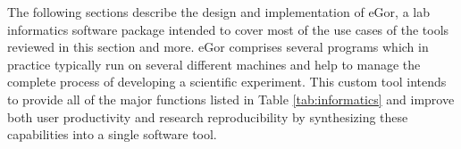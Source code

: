\documentclass[../thesis]{subfiles}
\begin{document}
The following sections describe the design and implementation of eGor,
a lab informatics software package intended to cover most of the use
cases of the tools reviewed in this section and more. eGor comprises
several programs which in practice typically run on several different
machines and help to manage the complete process of developing a
scientific experiment. This custom tool intends to provide all of the major
functions listed in Table \ref{tab:informatics} and improve both user
productivity and research reproducibility by synthesizing these
capabilities into a single software tool.
\end{document}
